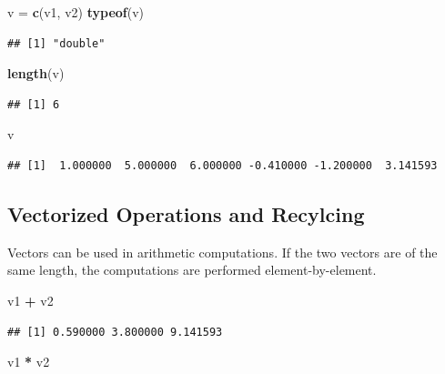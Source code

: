 \documentclass[
]{book}
\newenvironment{Shaded}{\begin{snugshade}}{\end{snugshade}}
\newcommand{\KeywordTok}[1]{\textcolor[rgb]{0.13,0.29,0.53}{\textbf{#1}}}
\newcommand{\NormalTok}[1]{#1}
\newcommand{\OperatorTok}[1]{\textcolor[rgb]{0.81,0.36,0.00}{\textbf{#1}}}
\newcommand{\StringTok}[1]{\textcolor[rgb]{0.31,0.60,0.02}{#1}}
\begin{document}
\begin{Shaded}
\begin{Highlighting}[]
\NormalTok{v =}\StringTok{ }\KeywordTok{c}\NormalTok{(v1, v2)}
\KeywordTok{typeof}\NormalTok{(v)}
\end{Highlighting}
\end{Shaded}

\begin{verbatim}
## [1] "double"
\end{verbatim}

\begin{Shaded}
\begin{Highlighting}[]
\KeywordTok{length}\NormalTok{(v)}
\end{Highlighting}
\end{Shaded}

\begin{verbatim}
## [1] 6
\end{verbatim}

\begin{Shaded}
\begin{Highlighting}[]
\NormalTok{v}
\end{Highlighting}
\end{Shaded}

\begin{verbatim}
## [1]  1.000000  5.000000  6.000000 -0.410000 -1.200000  3.141593
\end{verbatim}

\hypertarget{vectorized-operations-and-recylcing}{%
\subsection{Vectorized Operations and Recylcing}\label{vectorized-operations-and-recylcing}}

Vectors can be used in arithmetic computations. If the two vectors are of the same length, the computations are performed element-by-element.

\begin{Shaded}
\begin{Highlighting}[]
\NormalTok{v1 }\OperatorTok{+}\StringTok{ }\NormalTok{v2}
\end{Highlighting}
\end{Shaded}

\begin{verbatim}
## [1] 0.590000 3.800000 9.141593
\end{verbatim}

\begin{Shaded}
\begin{Highlighting}[]
\NormalTok{v1 }\OperatorTok{*}\StringTok{ }\NormalTok{v2}
\end{Highlighting}
\end{Shaded}
\end{document}
